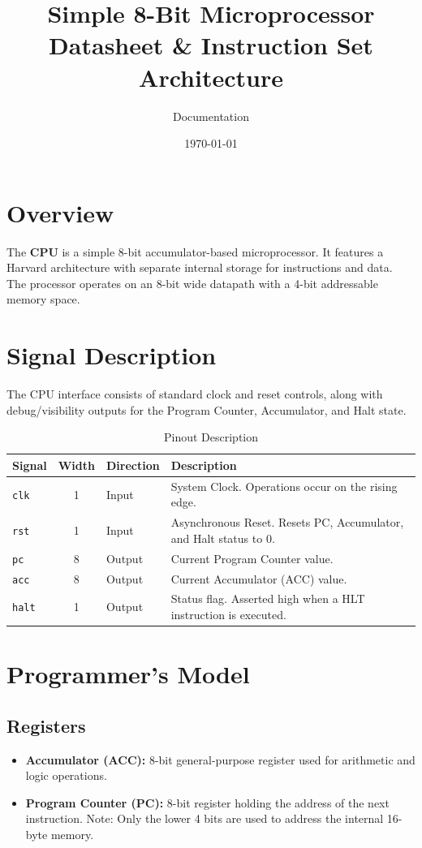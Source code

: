 \documentclass{article}
\title{Simple 8-Bit Microprocessor \\ \large Datasheet \& Instruction Set Architecture}
\author{Documentation}
\date{\today}
\begin{document}
\maketitle

\section{Overview}
The \textbf{CPU} is a simple 8-bit accumulator-based microprocessor. It features a Harvard architecture with separate internal storage for instructions and data. The processor operates on an 8-bit wide datapath with a 4-bit addressable memory space.

\section{Signal Description}
The CPU interface consists of standard clock and reset controls, along with debug/visibility outputs for the Program Counter, Accumulator, and Halt state.

\begin{table}[!ht]
\caption{Pinout Description}
\centering
\renewcommand{\arraystretch}{1.2}
\begin{tabular}{|l|c|l|p{8cm}|}
\hline
\textbf{Signal} & \textbf{Width} & \textbf{Direction} & \textbf{Description} \\ \hline
\texttt{clk} & 1 & Input & System Clock. Operations occur on the rising edge. \\ \hline
\texttt{rst} & 1 & Input & Asynchronous Reset. Resets PC, Accumulator, and Halt status to 0. \\ \hline
\texttt{pc} & 8 & Output & Current Program Counter value. \\ \hline
\texttt{acc} & 8 & Output & Current Accumulator (ACC) value. \\ \hline
\texttt{halt} & 1 & Output & Status flag. Asserted high when a HLT instruction is executed. \\ \hline
\end{tabular}
\end{table}

\section{Programmer's Model}

\subsection{Registers}
\begin{itemize}
    \item \textbf{Accumulator (ACC):} 8-bit general-purpose register used for arithmetic and logic operations.
    \item \textbf{Program Counter (PC):} 8-bit register holding the address of the next instruction. Note: Only the lower 4 bits are used to address the internal 16-byte memory.
\end{itemize}
\end{document}
